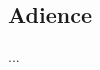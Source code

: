 \documentclass[10pt, a4paper, titlepage]{article}
\begin{document}
\begin{multicols}{2}
	\subsection{Adience}
	...
	

	\printbibliography
	
	\end{multicols}
\end{document}

